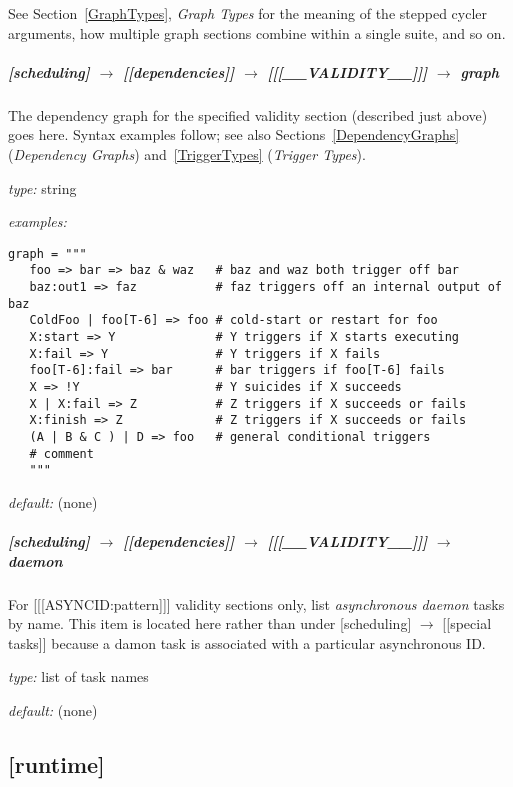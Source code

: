 See Section~\ref{GraphTypes}, {\em Graph Types} for the meaning of the
stepped cycler arguments, how multiple graph sections combine within a
single suite, and so on.

\subparagraph[graph]{[scheduling] $\rightarrow$ [[dependencies]] $\rightarrow$ [[[\_\_VALIDITY\_\_]]] $\rightarrow$ graph }
\label{GraphDescrip}

The dependency graph for the specified validity section (described just
above) goes here. Syntax examples follow; see also
Sections~\ref{DependencyGraphs} ({\em Dependency Graphs})
and~\ref{TriggerTypes} ({\em Trigger Types}). 

\begin{myitemize}
\item {\em type:} string 
\item {\em examples:}
  \begin{lstlisting}
graph = """
   foo => bar => baz & waz   # baz and waz both trigger off bar
   baz:out1 => faz           # faz triggers off an internal output of baz
   ColdFoo | foo[T-6] => foo # cold-start or restart for foo
   X:start => Y              # Y triggers if X starts executing
   X:fail => Y               # Y triggers if X fails
   foo[T-6]:fail => bar      # bar triggers if foo[T-6] fails
   X => !Y                   # Y suicides if X succeeds
   X | X:fail => Z           # Z triggers if X succeeds or fails
   X:finish => Z             # Z triggers if X succeeds or fails
   (A | B & C ) | D => foo   # general conditional triggers
   # comment
   """
  \end{lstlisting}
\item {\em default:} (none)
\end{myitemize}

\subparagraph[daemon]{[scheduling] $\rightarrow$ [[dependencies]] $\rightarrow$ [[[\_\_VALIDITY\_\_]]] $\rightarrow$ daemon }

For [[[ASYNCID:pattern]]] validity sections only, list 
{\em asynchronous daemon} tasks by name. This item is located here rather than
under [scheduling] $\rightarrow$ [[special tasks]] because a damon task
is associated with a particular asynchronous ID.

\begin{myitemize}
\item {\em type:} list of task names
\item {\em default:} (none)
\end{myitemize}

\subsection{[runtime]}


